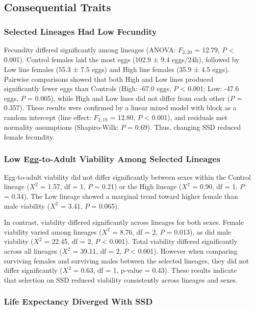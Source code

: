 \documentclass[12pt,reqno,oneside]{report}
\begin{document}
\subsection{Consequential Traits}

\subsubsection{Selected Lineages Had Low Fecundity}

Fecundity differed significantly among lineages (ANOVA: \(F_{2,20}\) = 12.79, $P$ < 0.001). Control females laid the most eggs (102.9 ± 9.4 eggs/24h), followed by Low line females (55.3 ± 7.5 eggs) and High line females (35.9 ± 4.5 eggs). Pairwise comparisons showed that both High and Low lines produced significantly fewer eggs than Controls (High: -67.0 eggs, $P$ < 0.001; Low: -47.6 eggs, $P$ = 0.005), while High and Low lines did not differ from each other ($P$ = 0.357). These results were confirmed by a linear mixed model with block as a random intercept (line effect: \(F_{2,19}\) = 12.80, $P$ < 0.001), and residuals met normality assumptions (Shapiro-Wilk: $P$ = 0.69). Thus, changing SSD reduced female fecundity.

\subsubsection{Low Egg-to-Adult Viability Among Selected Lineages}

Egg-to-adult viability did not differ significantly between sexes within the Control lineage (\(X^2\) = 1.57, df = 1, $P$ = 0.21) or the High lineage (\(X^2\) = 0.90, df = 1, $P$ = 0.34). The Low lineage showed a marginal trend toward higher female than male viability (\(X^2\) = 3.41, $P$ = 0.065).

In contrast, viability differed significantly across lineages for both sexes. Female viability varied among lineages (\(X^2\) = 8.76, df = 2, $P$ = 0.013), as did male viability (\(X^2\) = 22.45, df = 2, $P$ < 0.001). Total viability differed significantly across all lineages (\(X^2\) = 39.11, df = 2, $P$ < 0.001). However when comparing surviving females and surviving males between the selected lineages, they did not differ significantly (\(X^2\) = 0.63, df = 1, p-value = 0.43). These results indicate that selection on SSD reduced viability consistently across lineages and sexes. 

\subsubsection{Life Expectancy Diverged With SSD}
\end{document}
